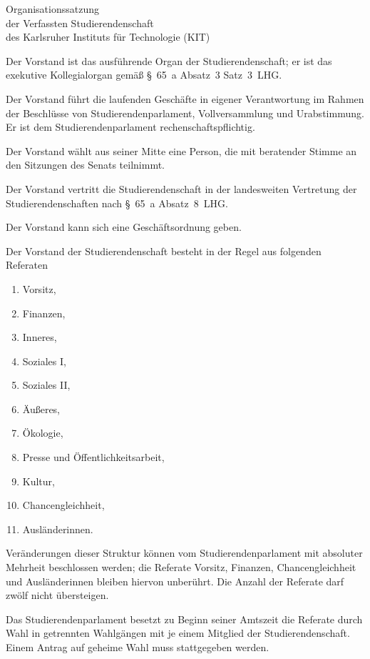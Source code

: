 \begin{jurdoc}[Organisationssatzung]{Organisationssatzung\\der Verfassten Studierendenschaft\\des Karlsruher Instituts für Technologie (KIT)}
%
%



Der Vorstand ist das ausführende Organ der Studierendenschaft; er ist das exekutive Kollegialorgan gemäß §~65~a Absatz~3 Satz~3~LHG.

Der Vorstand führt die laufenden Geschäfte in eigener Verantwortung im Rahmen der Beschlüsse von Studierendenparlament, Vollversammlung und Urabstimmung. Er ist dem Studierendenparlament rechenschaftspflichtig.

Der Vorstand wählt aus seiner Mitte eine Person, die mit beratender Stimme an den Sitzungen des Senats teilnimmt.

Der Vorstand vertritt die Studierendenschaft in der landesweiten Vertretung der Studierendenschaften nach §~65~a Absatz~8~LHG.

Der Vorstand kann sich eine Geschäftsordnung geben.


 \label{vorstand:zusammensetzung}

Der Vorstand der Studierendenschaft besteht in der Regel aus folgenden Referaten \label{vorstand:zusammensetzung:regel}
\begin{enumerate}
\item Vorsitz,
\item Finanzen,
\item Inneres,
\item Soziales I,
\item Soziales II,
\item Äußeres,
\item Ökologie,
\item Presse und Öffentlichkeitsarbeit,
\item Kultur,
\item Chancengleichheit,
\item Ausländerinnen.
\end{enumerate}
Veränderungen dieser Struktur können vom Studierendenparlament mit absoluter Mehrheit beschlossen werden; die Referate Vorsitz, Finanzen, Chancengleichheit und Ausländerinnen bleiben hiervon unberührt. Die Anzahl der Referate darf zwölf nicht übersteigen.

Das Studierendenparlament besetzt zu Beginn seiner Amtszeit die Referate durch Wahl in getrennten Wahlgängen mit je einem Mitglied der Studierendenschaft. Einem Antrag auf geheime Wahl muss stattgegeben werden\label{vorstand:zusammensetzung:wahl}.


\end{jurdoc}
